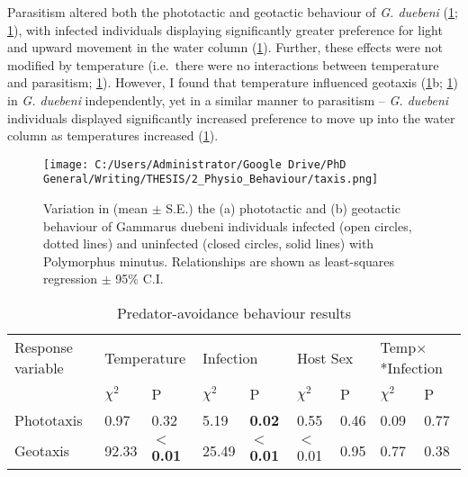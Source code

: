 Parasitism altered both the phototactic and geotactic behaviour of \emph{G. duebeni} (\ref{fig:taxis}; \ref{tab:taxistab}), with infected individuals displaying significantly greater preference for light and upward movement in the water column (\ref{fig:taxis}). Further, these effects were not modified by temperature (i.e.\ there were no interactions between temperature and parasitism; \ref{fig:taxis}). However, I found that temperature influenced geotaxis (\ref{fig:taxis}b; \ref{tab:taxistab}) in \emph{G. duebeni} independently, yet in a similar manner to parasitism – \emph{G. duebeni} individuals displayed significantly increased preference to move up into the water column as temperatures increased (\ref{fig:taxis}). 

\begin{figure}%
    \centering
    \texttt{[image: C:/Users/Administrator/Google Drive/PhD General/Writing/THESIS/2\_Physio\_Behaviour/taxis.png]}
  \caption [Impact of temperature and parasites on predator-avoidance behaviour]{Variation in (mean $\pm$ S.E.) the (a) phototactic and (b) geotactic behaviour of Gammarus duebeni individuals infected (open circles, dotted lines) and uninfected (closed circles, solid lines) with Polymorphus minutus. Relationships are shown as least-squares regression $\pm$ 95\% C.I.} 
    \label{fig:taxis}
\end{figure}

\begin{table}
\caption[Results of chi-squared analysis of linear mixed-effects models testing the impact of temperature, parasitic infection, and host sex on the geotactic and phototactic behaviour of \emph{Gammarus duebeni}. Significant terms are listed in bold.]{Predator-avoidance behaviour results}
\begin{tabular}{lllllllll}
Response variable & \multicolumn{2}{l}{Temperature} & \multicolumn{2}{l}{Infection} & \multicolumn{2}{l}{Host Sex} & \multicolumn{2}{l}{Temp$\times$*Infection} \\
                  & $\chi^2$         & P                  & $\chi^2$       & P                  & $\chi^2$                 & P       & $\chi^2$               & P               \\
Phototaxis        & 0.97       & 0.32               & 5.19     & \textbf{0.02}               & 0.55               & 0.46    & 0.09             & 0.77            \\
Geotaxis          & 92.33      &\textbf{$<$0.01}     & 25.49    & \textbf{$<$0.01}   & $<$0.01    & 0.95    & 0.77             & 0.38           
\end{tabular}
\label{tab:taxistab}
\end{table}


